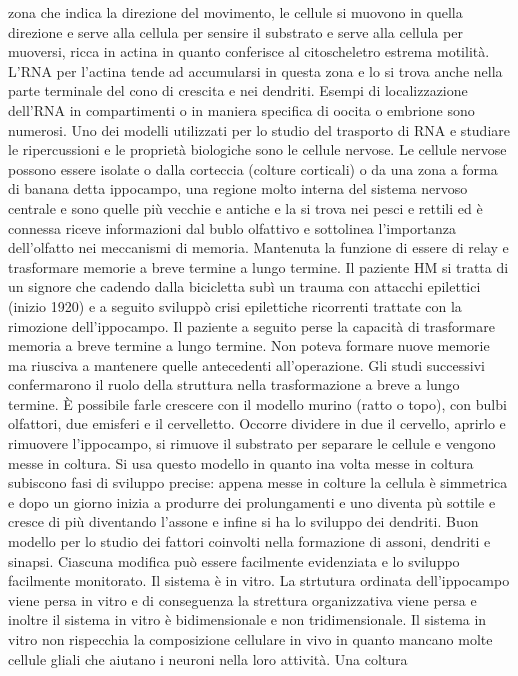 zona che indica la direzione del movimento, le cellule si muovono in quella direzione e serve alla cellula per sensire il substrato e serve alla cellula per muoversi, ricca in actina
in quanto conferisce al citoscheletro estrema motilit\`a. L'RNA per l'actina tende ad accumularsi in questa zona e lo si trova anche nella parte terminale del cono di crescita e nei 
dendriti. Esempi di localizzazione dell'RNA in compartimenti o in maniera specifica di oocita o embrione sono numerosi. Uno dei modelli utilizzati per lo studio del trasporto di RNA e 
studiare le ripercussioni e le propriet\`a biologiche sono le cellule nervose. Le cellule nervose possono essere isolate o dalla corteccia (colture corticali) o da una zona a forma 
di banana detta ippocampo, una regione molto interna del sistema nervoso centrale e sono quelle pi\`u vecchie e antiche e la si trova nei pesci e rettili ed \`e connessa riceve 
informazioni dal bublo olfattivo e sottolinea l'importanza dell'olfatto nei meccanismi di memoria. Mantenuta la funzione di essere di relay e trasformare memorie a breve termine a lungo
termine. Il paziente HM si tratta di un signore che cadendo dalla bicicletta sub\`i un trauma con attacchi epilettici (inizio 1920) e a seguito svilupp\`o crisi epilettiche ricorrenti
trattate con la rimozione dell'ippocampo. Il paziente a seguito perse la capacit\`a di trasformare memoria a breve termine a lungo termine. Non poteva formare nuove memorie ma riusciva 
a mantenere quelle antecedenti all'operazione. Gli studi successivi confermarono il ruolo della struttura nella trasformazione a breve a lungo termine. \`E possibile farle crescere con
il modello murino (ratto o topo), con bulbi olfattori, due emisferi e il cervelletto. Occorre dividere in due il cervello, aprirlo e rimuovere l'ippocampo, si rimuove il substrato per 
separare le cellule e vengono messe in coltura. Si usa questo modello in quanto ina volta messe in coltura subiscono fasi di sviluppo precise: appena messe in colture la cellula \`e 
simmetrica e dopo un giorno inizia a produrre dei prolungamenti e uno diventa p\`u sottile e cresce di pi\`u diventando l'assone e infine si ha lo sviluppo dei dendriti. Buon modello
per lo studio dei fattori coinvolti nella formazione di assoni, dendriti e sinapsi. Ciascuna modifica pu\`o essere facilmente evidenziata e lo sviluppo facilmente monitorato. Il sistema
\`e in vitro. La strtutura ordinata dell'ippocampo viene persa in vitro e di conseguenza la strettura organizzativa viene persa e inoltre il sistema in vitro \`e bidimensionale e non
tridimensionale. Il sistema in vitro non rispecchia la composizione cellulare in vivo in quanto mancano molte cellule gliali che aiutano i neuroni nella loro attivit\`a. Una coltura

